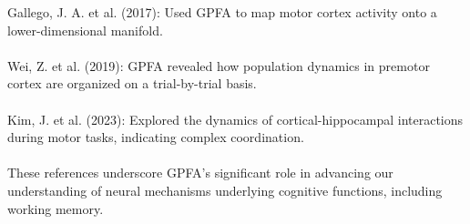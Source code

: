 {Gallego, J. A. et al. (2017): Used GPFA to map motor cortex activity onto a lower-dimensional manifold.\\
\\
Wei, Z. et al. (2019): GPFA revealed how population dynamics in premotor cortex are organized on a trial-by-trial basis.\\
\\
Kim, J. et al. (2023): Explored the dynamics of cortical-hippocampal interactions during motor tasks, indicating complex coordination.\\
\\
These references underscore GPFA’s significant role in advancing our understanding of neural mechanisms underlying cognitive functions, including working memory.\\
}
